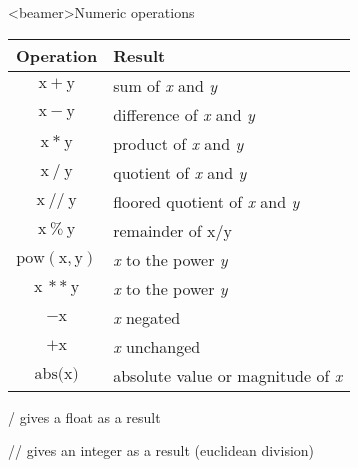 \begin{frame}<beamer>{Numeric operations}

  \begin{center}

%

  \begin{tabular}{| c | l |}
    \hline
    \textbf{Operation} & \textbf{Result} \\
    \hline
    $ \text{x} \: + \: \text{y} $ 	& sum of \textit{x} and \textit{y} \\
    $ \text{x} \: - \: \text{y} $ 	& difference of \textit{x} and \textit{y} \\
    $ \text{x} \: * \: \text{y} $ 	& product of \textit{x} and \textit{y} \\
    $ \text{x} \: / \: \text{y} $ 	& quotient of \textit{x} and \textit{y} \\
    $ \text{x} \: // \: \text{y} $ 	& floored quotient of \textit{x} and \textit{y} \\
    $ \text{x} \: \% \: \text{y} $ 	& remainder of $ \text{x} / \text{y} $ \\
    $ \text{pow}(\text{x}, \text{y}) $ 	& \textit{x} to the power \textit{y} \\
    $ \text{x} \: ** \: \text{y} $ 		& \textit{x} to the power \textit{y} \\
    $ - \text{x} $ 		& \textit{x} negated \\
    $ + \text{x} $ 		& \textit{x} unchanged \\
    $ \text{abs(x)} $ 	& absolute value or magnitude of \textit{x} \\
    \hline
  \end{tabular}

  \medskip

  \textquotedbl /\textquotedbl{} gives a float as a result

  \textquotedbl //\textquotedbl{} gives an integer as a result (euclidean division)

  \end{center}

\end{frame}


